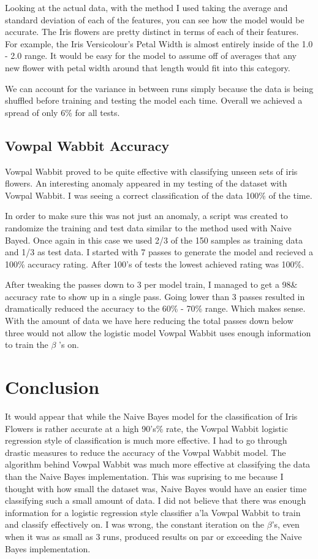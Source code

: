 \documentclass{article}
\begin{document}
Looking at the actual data, with the method I used taking the average and standard deviation of each of the features, you can see how the model would be accurate. The Iris flowers are pretty distinct in terms of each of their features. For example, the Iris Versicolour's Petal Width is almost entirely inside of the 1.0 - 2.0 range. It would be easy for the model to assume off of averages that any new flower with petal width around that length would fit into this category. 

We can account for the variance in between runs simply because the data is being shuffled before training and testing the model each time. Overall we achieved a spread of only 6\% for all tests. 

\subsection{Vowpal Wabbit Accuracy}
Vowpal Wabbit proved to be quite effective with classifying unseen sets of iris flowers. An interesting anomaly appeared in my testing of the dataset with Vowpal Wabbit. I was seeing a correct classification of the data 100\% of the time. 

In order to make sure this was not just an anomaly, a script was created to randomize the training and test data similar to the method used with Naive Bayed. Once again in this case we used 2/3 of the 150 samples as training data and 1/3 as test data. I started with 7 passes to generate the model and recieved a 100\% accuracy rating. After 100's of tests the lowest achieved rating was 100\%.

After tweaking the passes down to 3 per model train, I managed to get a 98\& accuracy rate to show up in a single pass. Going lower than 3 passes resulted in dramatically reduced the accuracy to the 60\% - 70\% range. Which makes sense. With the amount of data we have here reducing the total passes down below three would not allow the logistic model Vowpal Wabbit uses enough information to train the $\beta$ 's on.

\section{Conclusion}
It would appear that while the Naive Bayes model for the classification of Iris Flowers is rather accurate at a high 90's\% rate, the Vowpal Wabbit logistic regression style of classification is much more effective. I had to go through drastic measures to reduce the accuracy of the Vowpal Wabbit model. The algorithm behind Vowpal Wabbit was much more effective at classifying the data than the Naive Bayes implementation. This was suprising to me because I thought with how small the dataset was, Naive Bayes would have an easier time classifying such a small amount of data. I did not believe that there was enough information for a logistic regression style classifier a'la Vowpal Wabbit to train and classify effectively on. I was wrong, the constant iteration on the $\beta$'s, even when it was as small as 3 runs, produced results on par or exceeding the Naive Bayes implementation. 
\end{document}
